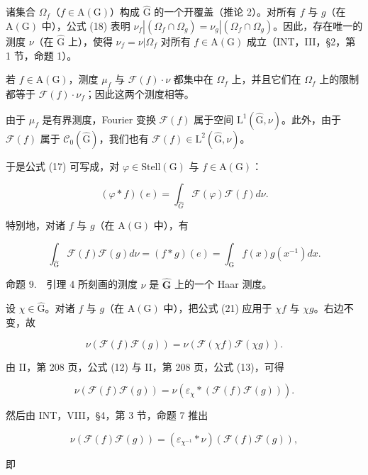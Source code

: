 诸集合 \(\Omega_f\)（\(f \in \mathrm{A}(\mathrm{G})\)）构成 \(\widehat{\mathrm{G}}\) 的一个开覆盖（推论 2）。对所有 \(f\) 与 \(g\)（在 \(\mathrm{A}(\mathrm{G})\) 中），公式 (18) 表明 \(\nu_f|(\Omega_f \cap \Omega_g) = \nu_g|(\Omega_f \cap \Omega_g)\)。因此，存在唯一的测度 \(\nu\)（在 \(\widehat{\mathrm{G}}\) 上），使得 \(\nu_f = \nu|\Omega_f\) 对所有 \(f \in \mathrm{A}(\mathrm{G})\) 成立（INT，III，§2，第 1 节，命题 1）。

若 \(f \in \mathrm{A}(\mathrm{G})\)，测度 \(\mu_f\) 与 \(\mathcal{F}(f) \cdot \nu\) 都集中在 \(\Omega_f\) 上，并且它们在 \(\Omega_f\) 上的限制都等于 \(\mathcal{F}(f) \cdot \nu_f\)；因此这两个测度相等。

由于 \(\mu_f\) 是有界测度，Fourier 变换 \(\mathcal{F}(f)\) 属于空间 \(\mathrm{L}^1 (\widehat{\mathrm{G}},\nu)\)。此外，由于 \(\mathcal{F}(f)\) 属于 \(\mathcal{C}_0(\widehat{\mathrm{G}})\)，我们也有 \(\mathcal{F}(f)\in \mathrm{L}^2 (\widehat{\mathrm{G}},\nu)\)。

于是公式 (17) 可写成，对 \(\varphi\in\mathrm{Stell}(\mathrm{G})\) 与 \(f\in\mathrm{A}(\mathrm{G})\)：

\[
(\varphi * f) (e) = \int_ {\widehat {G}} \mathcal {F} (\varphi) \mathcal {F} (f) d \nu .\tag{20}
\]

特别地，对诸 \(f\) 与 \(g\)（在 \(\mathrm{A}(\mathrm{G})\) 中），有

\[
\int_ {\widehat {\mathrm{G}}} \mathcal {F} (f) \mathcal {F} (g) d \nu = (f * g) (e) = \int_ {\mathrm{G}} f (x) g (x ^ {- 1}) d x.\tag{21}
\]

命题 9.　引理 4 所刻画的测度 \(\nu\) 是 \(\widehat{\mathbf{G}}\) 上的一个 Haar 测度。

设 \(\chi \in \widehat{\mathrm{G}}\)。对诸 \(f\) 与 \(g\)（在 \(\mathrm{A}(\mathrm{G})\) 中），把公式 (21) 应用于 \(\chi f\) 与 \(\chi g\)。右边不变，故

\[
\nu (\mathcal {F} (f) \mathcal {F} (g)) = \nu (\mathcal {F} (\chi f) \mathcal {F} (\chi g)).
\]

由 II，第 208 页，公式 (12) 与 II，第 208 页，公式 (13)，可得

\[
\nu (\mathcal {F} (f) \mathcal {F} (g)) = \nu (\varepsilon_ {\chi} * (\mathcal {F} (f) \mathcal {F} (g))).
\]

然后由 INT，VIII，§4，第 3 节，命题 7 推出

\[
\nu (\mathcal {F} (f) \mathcal {F} (g)) = (\varepsilon_ {\chi^ {- 1}} * \nu) (\mathcal {F} (f) \mathcal {F} (g)),
\]

即

